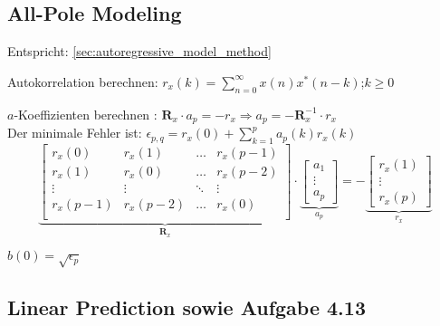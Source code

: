\subsection{All-Pole Modeling }
Entspricht: \ref{sec:autoregressive_model_method}
\begin{aufzaehlung}
	\item Autokorrelation berechnen: $ r_x(k) = \sum\limits_{n=0}^\infty x(n)x^*(n-k)$;\qquad $k\geq 0$
	\item $a$-Koeffizienten berechnen : $\bm R_x \cdot a_p = -r_x \Longrightarrow a_p = - \bm R_x^{-1} \cdot r_x$ 
  		 \small\\
		Der minimale Fehler ist: $\epsilon_{p,q} = r_x(0) + \sum\limits_{k=1}^p a_p(k) r_x(k)$
			$$
		\underbrace{\begin{bmatrix}
    		r_x(0) & r_x(1) & \hdots & r_x(p-1) \\                                   
    		r_x(1) & r_x(0) & \hdots & r_x(p-2) \\
    		\vdots & \vdots & \ddots & \vdots \\                             
    		r_x(p-1) & r_x(p-2) & \hdots & r_x(0) \\                        
		\end{bmatrix}  }_{\bm R_x} \cdot 
		\underbrace{\begin{bmatrix}
    		a_1 \\
    		\vdots \\
    		a_p
		\end{bmatrix}  }_{a_p}= -\underbrace{\begin{bmatrix}
    		r_x(1) \\
    		\vdots \\
    		r_x(p)
		\end{bmatrix}  }_{r_x}$$ 
	\item $b(0) = \sqrt{\epsilon_p}$ 
\end{aufzaehlung}

\subsection{Linear Prediction  sowie Aufgabe 4.13}

